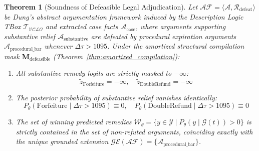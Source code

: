 \documentclass[11pt,a4paper]{article}
\newtheorem{theorem}{Theorem}
\begin{document}
\begin{theorem}[Soundness of Defeasible Legal Adjudication]
\label{thm:defeasible_soundness}
Let $\mathcal{AF} = \langle \mathcal{A}, \mathcal{R}_{\text{defeat}} \rangle$ be Dung's abstract argumentation framework \citep{dung1995acceptability} induced by the Description Logic TBox $\mathcal{T}_{\mathcal{VCLO}}$ and extracted case facts $\mathcal{A}_{\text{case}}$, where arguments supporting substantive relief $\mathcal{A}_{\text{substantive}}$ are defeated by procedural expiration arguments $\mathcal{A}_{\text{procedural\_bar}}$ whenever $\Delta \tau > 1095$. 
Under the amortized structural compilation mask $\mathbf{M}_{\text{defeasible}}$ (Theorem~\ref{thm:amortized_compilation}):
\begin{enumerate}[label=(\roman*)]
\item All substantive remedy logits are strictly masked to $-\infty$:
\begin{equation}
\tilde{z}_{\text{Forfeiture}} = -\infty, \quad \tilde{z}_{\text{DoubleRefund}} = -\infty
\end{equation}
\item The posterior probability of substantive relief vanishes identically:
\begin{equation}
P_\theta(\text{Forfeiture} \mid \Delta \tau > 1095) \equiv 0, \quad P_\theta(\text{DoubleRefund} \mid \Delta \tau > 1095) \equiv 0
\end{equation}
\item The set of winning predicted remedies $\mathcal{W}_\theta = \{ y \in \mathcal{Y} \mid P_\theta(y \mid \mathcal{G}(t)) > 0 \}$ is strictly contained in the set of non-refuted arguments, coinciding exactly with the unique grounded extension $\mathcal{GE}(\mathcal{AF}) = \{\mathcal{A}_{\text{procedural\_bar}}\}$.
\end{enumerate}
\end{theorem}
\end{document}
